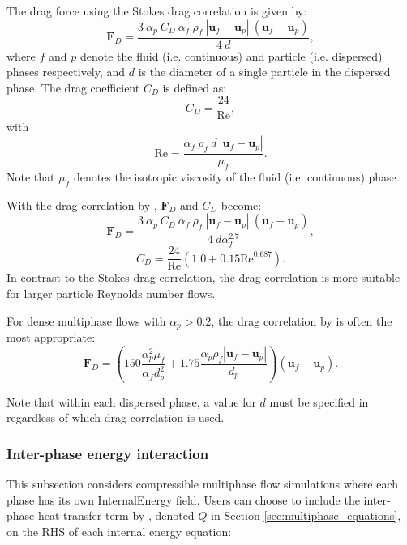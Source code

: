 The drag force using the Stokes drag correlation is given by:
\begin{equation}\label{eq:stokes_drag_force}
\mathbf{F}_D = \frac{3\ \alpha_p\ C_D\ \alpha_f\ \rho_f\ |\mathbf{u}_f-\mathbf{u}_p|\ (\mathbf{u}_f-\mathbf{u}_p)}{4\ d},
\end{equation}
where $f$ and $p$ denote the fluid (i.e. continuous) and particle (i.e. dispersed) phases respectively, and $d$ is the diameter of a single particle in the dispersed phase. The drag coefficient $C_D$ is defined as:
\begin{equation}\label{eq:stokes_drag_coefficient}
C_D = \frac{24}{\mathrm{Re}},
\end{equation}
with
\begin{equation}\label{eq:particle_reynolds_number}
\mathrm{Re} = \frac{\alpha_f\ \rho_f\ d\ |\mathbf{u}_f-\mathbf{u}_p|}{\mu_f}.
\end{equation}
Note that $\mu_f$ denotes the isotropic viscosity of the fluid (i.e. continuous) phase.

With the drag correlation by \cite{wen_yu_1966}, $\mathbf{F}_D$ and $C_D$ become:
\begin{equation}\label{eq:wen_yu_drag_force}
\mathbf{F}_D = \frac{3\ \alpha_p\ C_D\ \alpha_f\ \rho_f\ |\mathbf{u}_f-\mathbf{u}_p|\ (\mathbf{u}_f-\mathbf{u}_p)}{4\ d\alpha_f^{2.7}},
\end{equation}
\begin{equation}\label{eq:wen_yu_drag_coefficient}
C_D = \frac{24}{\mathrm{Re}}\left(1.0 + 0.15\mathrm{Re}^{0.687}\right).
\end{equation}
In contrast to the Stokes drag correlation, the \cite{wen_yu_1966} drag correlation is more suitable for larger particle Reynolds number flows. 

For dense multiphase flows with $\alpha_p > 0.2$, the drag correlation by \cite{ergun1952} is often the most appropriate:
\begin{equation}\label{eq:ergun_drag_force}
\mathbf{F}_D = \left(150\frac{\alpha_p^2\mu_f}{\alpha_f d_p^2} + 1.75\frac{\alpha_p\rho_f|\mathbf{u}_f-\mathbf{u}_p|}{d_p}\right)\left(\mathbf{u}_f-\mathbf{u}_p\right).
\end{equation}

Note that within each dispersed phase, a value for $d$ must be specified in  regardless of which drag correlation is used.

\subsubsection{Inter-phase energy interaction}
This subsection considers compressible multiphase flow simulations where each phase has its own InternalEnergy field. Users can choose to include the inter-phase heat transfer term by \cite{gunn1978}, denoted $Q$ in Section \ref{sec:multiphase_equations}, on the RHS of each internal energy equation:

